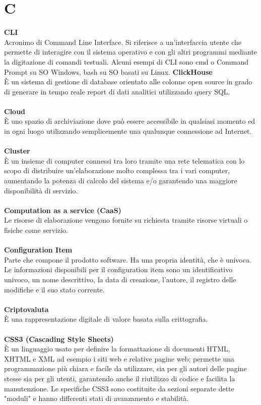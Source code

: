 \section{C}
\textbf{CLI}\\
Acronimo di Command Line Interface. Si riferisce a un'interfaccia utente che permette di interagire con il sistema operativo e con gli altri programmi mediante la digitazione di comandi testuali. Alcuni esempi di CLI sono cmd o Command Prompt su SO Windows, bash su SO basati su Linux.
\textbf{ClickHouse}\\
È un sistema di gestione di database orientato alle colonne open source in grado di generare in tempo reale report di dati analitici utilizzando query SQL. \\ \\
\textbf{Cloud}\\
È uno spazio di archiviazione dove può essere accessibile in qualsiasi momento ed in ogni luogo utilizzando semplicemente una qualunque connessione ad Internet. \\ \\
\textbf{Cluster}\\
È un insieme di computer connessi tra loro tramite una rete telematica con lo scopo di distribuire un'elaborazione molto complessa tra i vari computer, aumentando la potenza di calcolo del sistema e/o garantendo una maggiore disponibilità di servizio. \\ \\
\textbf{Computation as a service (CaaS)}\\
Le risorse di elaborazione vengono fornite su richiesta tramite risorse virtuali o fisiche come servizio. \\ \\
\textbf{Configuration Item}\\
Parte che compone il prodotto software. Ha una propria identità, che è univoca. Le informazioni disponibili per il configuration item sono un identificativo univoco, un nome descrittivo, la data di creazione, l'autore, il registro delle modifiche e il suo stato corrente.\\ \\
\textbf{Criptovaluta}\\
È una rappresentazione digitale di valore basata sulla crittografia. \\ \\
\textbf{CSS3 (Cascading Style Sheets)}\\
È un linguaggio usato per definire la formattazione di documenti HTML, XHTML e XML ad esempio i siti web e relative pagine web; permette una programmazione più chiara e facile da utilizzare, sia per gli autori delle pagine stesse sia per gli utenti, garantendo anche il riutilizzo di codice e facilita la manutenzione. Le specifiche CSS3 sono costituite da sezioni separate dette "moduli" e hanno differenti stati di avanzamento e stabilità. \\ \\
